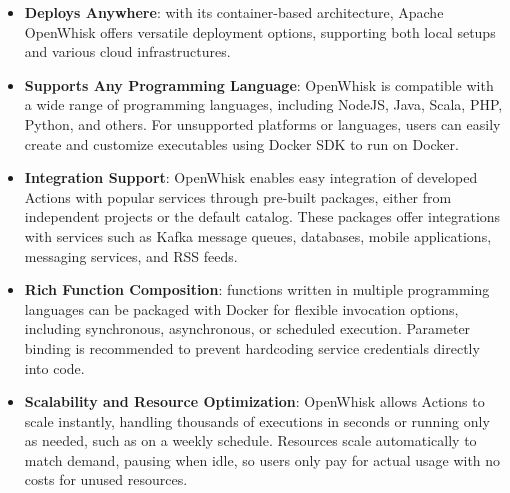 \begin{itemize}
    \item \textbf{Deploys Anywhere}: with its container-based architecture, Apache OpenWhisk offers versatile deployment options, supporting both local setups and various cloud infrastructures.
    \item \textbf{Supports Any Programming Language}: OpenWhisk is compatible with a wide range of programming languages, including NodeJS, Java, Scala, PHP, Python, and others. For unsupported platforms or languages, users can easily create and customize executables using Docker SDK to run on Docker.
    \item \textbf{Integration Support}: OpenWhisk enables easy integration of developed Actions with popular services through pre-built packages, either from independent projects or the default catalog. These packages offer integrations with services such as Kafka message queues, databases, mobile applications, messaging services, and RSS feeds.
    \item \textbf{Rich Function Composition}: functions written in multiple programming languages can be packaged with Docker for flexible invocation options, including synchronous, asynchronous, or scheduled execution. Parameter binding is recommended to prevent hardcoding service credentials directly into code.
    \item \textbf{Scalability and Resource Optimization}: OpenWhisk allows Actions to scale instantly, handling thousands of executions in seconds or running only as needed, such as on a weekly schedule. Resources scale automatically to match demand, pausing when idle, so users only pay for actual usage with no costs for unused resources.
\end{itemize}